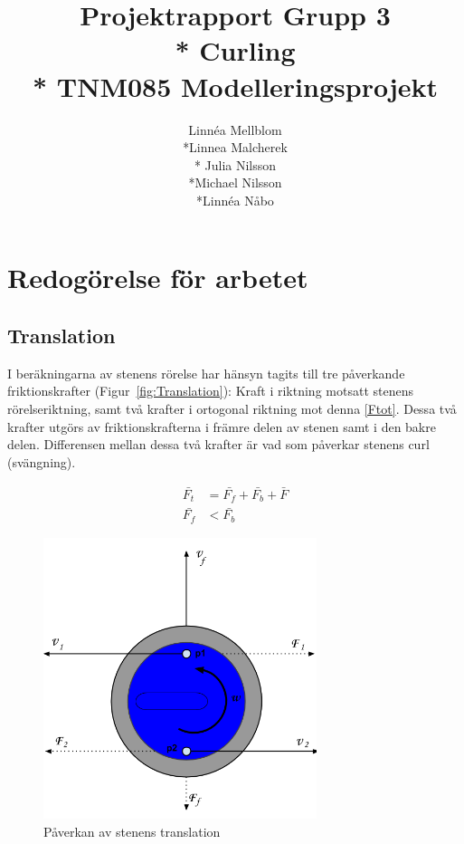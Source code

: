 \documentclass[11pt]{article} %
\title{Projektrapport Grupp 3 \\* 
Curling\\*
TNM085 Modelleringsprojekt}
\author{Linnéa Mellblom\\*Linnea Malcherek\\* Julia Nilsson\\*Michael Nilsson\\*Linnéa Nåbo}
\begin{document}
\maketitle
\pagebreak
{}  

\section{Redogörelse för arbetet}

\subsection{Translation}

I beräkningarna av stenens rörelse har hänsyn tagits till tre påverkande friktionskrafter (Figur~\ref{fig:Translation}): Kraft i riktning motsatt stenens rörelseriktning, samt två krafter i ortogonal riktning mot denna \eqref{Ftot}. Dessa två krafter utgörs av friktionskrafterna i främre delen av stenen samt i den bakre delen. Differensen mellan dessa två krafter är vad som påverkar stenens curl (svängning). 

 \begin{align}\label{Ftot}
 \bar{F_t}&=\bar{F_f}+\bar{F_b}+\bar{F}\\
 \bar{F_f}&<\bar{F_b}
 \end{align}


\begin{figure}[ht!]
\centering
\includegraphics[width=80mm]{Translation.png}
\caption{Påverkan av stenens translation}
\label{fig:Translation}
\label{overflow}
\end{figure}
\end{document}
